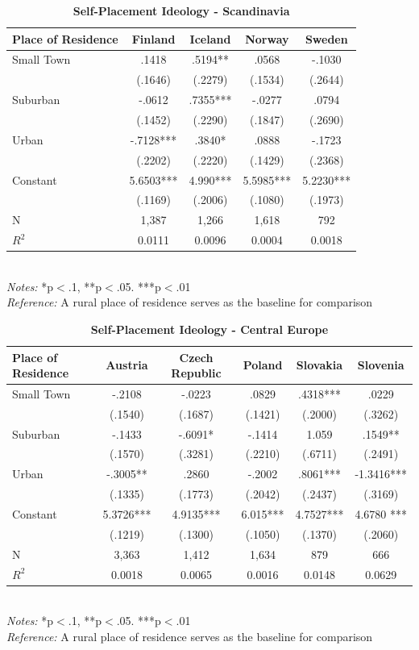 \documentclass[12pt, titlepage]{article}
\newcommand\e{\emph}
\newcommand\tb{\textbf}
\begin{document}
\begin{table}
	\centering
	\def\arraystretch{1.5}
	\caption{\tb{Self-Placement Ideology - Scandinavia}}
	\begin{tabulary}{\linewidth}{l c c c c}
		\\
		\hline
		\tb{Place of Residence}&\tb{Finland}&\tb{Iceland}&\tb{Norway}&\tb{Sweden} \\
		\hline
		Small Town&.1418&.5194**&.0568&-.1030 \\
		&(.1646)&(.2279)&(.1534)&(.2644) \\
		Suburban&-.0612&.7355***&-.0277&.0794 \\
		&(.1452)&(.2290)&(.1847)&(.2690) \\
		Urban&-.7128***&.3840*& .0888&-.1723\\
		&(.2202)&(.2220)&(.1429)&(.2368) \\
		Constant&5.6503***&4.990***&5.5985***&5.2230*** \\
		&(.1169)&(.2006)&(.1080)&(.1973) \\
		N&1,387&1,266&1,618&792\\
		$R^2$&0.0111&0.0096&0.0004&0.0018 \\
		\hline
	\end{tabulary}
\\
\e{Notes:} *p$<$.1, **p$<$.05. ***p$<$.01 \\
\e{Reference:} A rural place of residence serves as the baseline for comparison
\label{table6}
\end{table}

\begin{table}
	\centering
	\def\arraystretch{1.5}
	\caption{\tb{Self-Placement Ideology - Central Europe}}
	\begin{tabulary}{\linewidth}{l c c c c c}
		\\
		\hline
		\tb{Place of Residence} &\tb{Austria}&\tb{Czech Republic}& \tb{Poland} &\tb{Slovakia}&\tb{Slovenia} \\
		\hline
		Small Town&-.2108& -.0223 & .0829 & .4318*** & .0229 \\
		&(.1540) & (.1687) & (.1421) & (.2000) & (.3262)\\
		Suburban&-.1433& -.6091*& -.1414 & 1.059& .1549** \\
		&(.1570)&(.3281) & (.2210) & (.6711) & (.2491)\\
		Urban&-.3005**&.2860 & -.2002 & .8061*** & -1.3416***\\
		&(.1335) &(.1773) & (.2042) & (.2437) & (.3169)\\
		Constant& 5.3726***& 4.9135***& 6.015*** & 4.7527***  & 4.6780 ***\\
		&(.1219) & (.1300) & (.1050) & (.1370) & (.2060)\\
		N&3,363& 1,412& 1,634 & 879& 666 \\
		$R^2$&0.0018&0.0065 & 0.0016 & 0.0148 & 0.0629\\
		\hline
		\end{tabulary}
	\\
	\e{Notes:} *p$<$.1, **p$<$.05. ***p$<$.01 \\
	\e{Reference:} A rural place of residence serves as the baseline for comparison
	\label{table7}
	\end{table}
\end{document}
